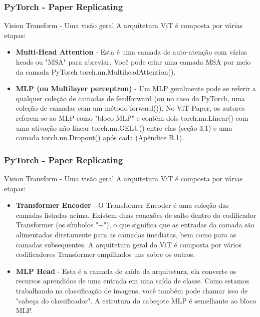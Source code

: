 \documentclass{beamer}
\begin{document}
\begin{frame}
	\frametitle{PyTorch - Paper Replicating}
	\begin{block}{Vision Transform - Uma visão geral}
		A arquitetura ViT é composta por várias etapas:
		\begin{itemize}
			\item \textbf{Multi-Head Attention} - Esta é uma camada de auto-atenção com várias heads ou "MSA" para abreviar. Você pode criar uma camada MSA por meio da camada PyTorch torch.nn.MultiheadAttention().
			\item \textbf{MLP (ou Multilayer perceptron)} - Um MLP geralmente pode se referir a qualquer coleção de camadas de feedforward (ou no caso do PyTorch, uma coleção de camadas com um método forward()). No ViT Paper, os autores referem-se ao MLP como "bloco MLP" e contém dois torch.nn.Linear() com uma ativação não linear torch.nn.GELU() entre elas (seção 3.1) e uma camada torch.nn.Dropout() após cada (Apêndice B.1).
		\end{itemize}
	\end{block}
\end{frame}
\begin{frame}
	\frametitle{PyTorch - Paper Replicating}
	\begin{block}{Vision Transform - Uma visão geral}
		A arquitetura ViT é composta por várias etapas:
		\begin{itemize}
			\item \textbf{Transformer Encoder} - O Transformer Encoder é uma coleção das camadas listadas acima. Existem duas conexões de salto dentro do codificador Transformer (os símbolos "+"), o que significa que as entradas da camada são alimentadas diretamente para as camadas imediatas, bem como para as camadas subsequentes. A arquitetura geral do ViT é composta por vários codificadores Transformer empilhados uns sobre os outros.
			\item \textbf{MLP Head} - Esta é a camada de saída da arquitetura, ela converte os recursos aprendidos de uma entrada em uma saída de classe. Como estamos trabalhando na classificação de imagens, você também pode chamar isso de "cabeça do classificador". A estrutura do cabeçote MLP é semelhante ao bloco MLP.
		\end{itemize}
	\end{block}
\end{frame}
\end{document}
